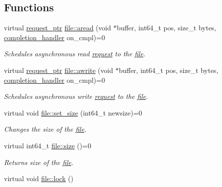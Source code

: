 \subsection*{Functions}
\begin{CompactItemize}
\item 
virtual \hyperlink{classrequest__ptr}{request\_\-ptr} \hyperlink{group__iolayer_gccc17bdde11461510dce18cefec5d207}{file::aread} (void $\ast$buffer, int64\_\-t pos, size\_\-t bytes, \hyperlink{classcompletion__handler}{completion\_\-handler} on\_\-cmpl)=0
\begin{CompactList}\small\item\em Schedules asynchronous read \hyperlink{classrequest}{request} to the \hyperlink{classfile}{file}. \item\end{CompactList}\item 
virtual \hyperlink{classrequest__ptr}{request\_\-ptr} \hyperlink{group__iolayer_g5c15b0b96abcfc0b06bb906afbf1dd2b}{file::awrite} (void $\ast$buffer, int64\_\-t pos, size\_\-t bytes, \hyperlink{classcompletion__handler}{completion\_\-handler} on\_\-cmpl)=0
\begin{CompactList}\small\item\em Schedules asynchronous write \hyperlink{classrequest}{request} to the \hyperlink{classfile}{file}. \item\end{CompactList}\item 
virtual void \hyperlink{group__iolayer_g0388ba482ccd9be978edef3d54e2e41c}{file::set\_\-size} (int64\_\-t newsize)=0
\begin{CompactList}\small\item\em Changes the size of the \hyperlink{classfile}{file}. \item\end{CompactList}\item 
virtual int64\_\-t \hyperlink{group__iolayer_g452fdcecf86299ffda1aba728a28c98d}{file::size} ()=0
\begin{CompactList}\small\item\em Returns size of the \hyperlink{classfile}{file}. \item\end{CompactList}\item 
\hypertarget{group__iolayer_g27be6a3162808bae88906d6f7b383fff}{
virtual void \hyperlink{group__iolayer_g27be6a3162808bae88906d6f7b383fff}{file::lock} ()}
\label{group__iolayer_g27be6a3162808bae88906d6f7b383fff}


\end{CompactItemize}

